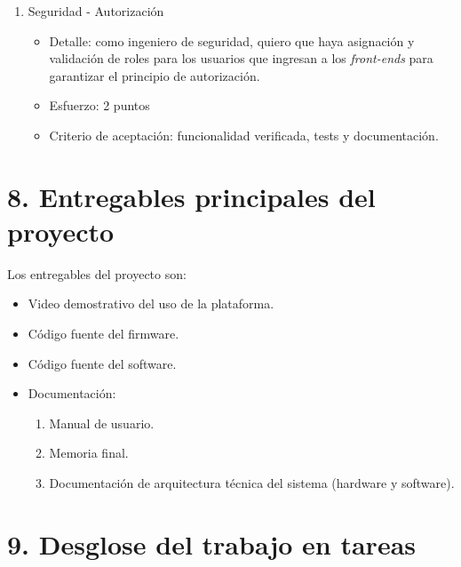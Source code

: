 \documentclass[
11pt, %
]{charter}
\begin{document}
\begin{enumerate}
\item Seguridad - Autorización
	\begin{itemize}
		\item Detalle: como ingeniero de seguridad, quiero que haya asignación y validación de roles para los usuarios que ingresan a los \textit{front-ends }para garantizar el principio de autorización.
		\item Esfuerzo: 2 puntos
		\item Criterio de aceptación: funcionalidad verificada, tests y documentación.
	\end{itemize}

\end{enumerate}


\section{8. Entregables principales del proyecto}
\label{sec:entregables}
Los entregables del proyecto son:
\begin{itemize}
	\item Video demostrativo del uso de la plataforma. 		
	\item Código fuente del firmware.
	\item Código fuente del software.
	\item Documentación:
	\begin{enumerate}				
		\item Manual de usuario.
		\item Memoria final.
		\item Documentación de arquitectura técnica del sistema (hardware y software).
	\end{enumerate}	
	
\end{itemize}


\section{9. Desglose del trabajo en tareas}
\label{sec:wbs}
\end{document}
